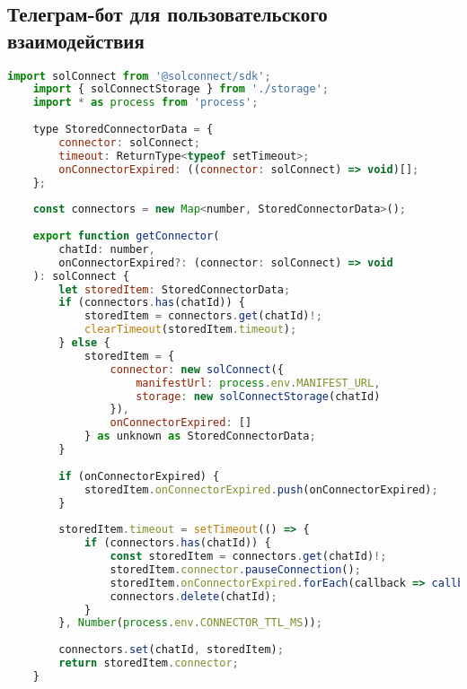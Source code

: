 \subsection{Телеграм-бот для пользовательского взаимодействия}
\label{appendix:sd_user_telegram}

\begin{lstlisting}[language=JavaScript, caption=Коннектор для подключения кошелька]
    import solConnect from '@solconnect/sdk';
    import { solConnectStorage } from './storage';
    import * as process from 'process';
    
    type StoredConnectorData = {
        connector: solConnect;
        timeout: ReturnType<typeof setTimeout>;
        onConnectorExpired: ((connector: solConnect) => void)[];
    };
    
    const connectors = new Map<number, StoredConnectorData>();
    
    export function getConnector(
        chatId: number,
        onConnectorExpired?: (connector: solConnect) => void
    ): solConnect {
        let storedItem: StoredConnectorData;
        if (connectors.has(chatId)) {
            storedItem = connectors.get(chatId)!;
            clearTimeout(storedItem.timeout);
        } else {
            storedItem = {
                connector: new solConnect({
                    manifestUrl: process.env.MANIFEST_URL,
                    storage: new solConnectStorage(chatId)
                }),
                onConnectorExpired: []
            } as unknown as StoredConnectorData;
        }
    
        if (onConnectorExpired) {
            storedItem.onConnectorExpired.push(onConnectorExpired);
        }
    
        storedItem.timeout = setTimeout(() => {
            if (connectors.has(chatId)) {
                const storedItem = connectors.get(chatId)!;
                storedItem.connector.pauseConnection();
                storedItem.onConnectorExpired.forEach(callback => callback(storedItem.connector));
                connectors.delete(chatId);
            }
        }, Number(process.env.CONNECTOR_TTL_MS));
    
        connectors.set(chatId, storedItem);
        return storedItem.connector;
    }
\end{lstlisting}

